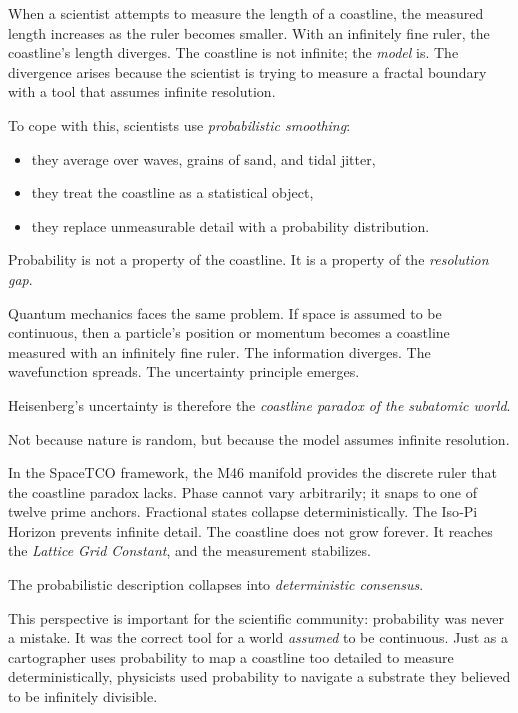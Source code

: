 \documentclass[reprint,amsmath,amssymb,aps,prl,floatfix]{revtex4-2}
\begin{document}
\begin{itemize}
When a scientist attempts to measure the length of a coastline, the measured length increases as the ruler becomes smaller. With an infinitely fine ruler, the coastline’s length diverges. The coastline is not infinite; the \textit{model} is. The divergence arises because the scientist is trying to measure a fractal boundary with a tool that assumes infinite resolution.
\medskip

To cope with this, scientists use \textit{probabilistic smoothing}:
\begin{itemize}
\item they average over waves, grains of sand, and tidal jitter,  
\item they treat the coastline as a statistical object,  
\item they replace unmeasurable detail with a probability distribution.
\end{itemize}
\medskip

Probability is not a property of the coastline.  
It is a property of the \textit{resolution gap}.
\medskip

Quantum mechanics faces the same problem.  
If space is assumed to be continuous, then a particle’s position or momentum becomes a coastline measured with an infinitely fine ruler. The information diverges. The wavefunction spreads. The uncertainty principle emerges.
\medskip

Heisenberg’s uncertainty is therefore the \textit{coastline paradox of the subatomic world}.
\medskip

Not because nature is random,  
but because the model assumes infinite resolution.
\medskip

In the SpaceTCO framework, the M46 manifold provides the discrete ruler that the coastline paradox lacks. Phase cannot vary arbitrarily; it snaps to one of twelve prime anchors. Fractional states collapse deterministically. The Iso‑Pi Horizon prevents infinite detail. The coastline does not grow forever. It reaches the \textit{Lattice Grid Constant}, and the measurement stabilizes.
\medskip

The probabilistic description collapses into \textit{deterministic consensus}.
\medskip

This perspective is important for the scientific community:  
probability was never a mistake. It was the correct tool for a world \textit{assumed} to be continuous. Just as a cartographer uses probability to map a coastline too detailed to measure deterministically, physicists used probability to navigate a substrate they believed to be infinitely divisible.
\medskip


\end{itemize}
\end{document}
